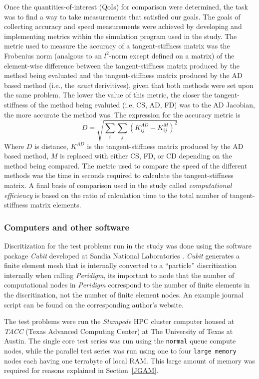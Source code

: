 \documentclass[preprint,12pt]{elsarticle}
\begin{document}
Once the quantities-of-interest (QoIs) for comparison were determined, the task was to find a way to take measurements that satisfied our goals. The goals of collecting accuracy and speed measurements were achieved by developing and implementing metrics within the simulation program used in the study. The metric used to measure the accuracy of a tangent-stiffness matrix was the Frobenius norm (analgous to an $l^2$-norm except defined on a matrix) of the element-wise difference between the tangent-stiffness matrix produced by the method being evaluated and the tangent-stiffness matrix produced by the AD based method (i.e., the \emph{exact} derivitives), given that both methods were set upon the same problem. The lower the value of this metric, the closer the tangent-stiffness of the method being evaluted (i.e, CS, AD, FD)  was to the AD Jacobian, the more accurate the method was. The expression for the accuracy metric is
%
\begin{equation} 
  D = \sqrt{\sum_i \sum_j(K^{AD}_{ij} - K^{M}_{ij})^2}
\end{equation}
%
Where $D$ is distance, $K^{AD}$ is the tangent-stiffness matrix produced by the AD based method, $M$ is replaced with either CS, FD, or CD depending on the method being compared.  The metric used to compare the speed of the different methods was the time in seconds required to calculate the tangent-stiffness matrix. A final basis of comparison used in the study called \emph{computational efficiency} is based on the ratio of calculation time to the total number of tangent-stiffness matrix elements.

\subsubsection{Computers and other software} 
%
Discritization for the test problems run in the study was done using the software package \emph{Cubit} developed at Sandia National Laboratories \cite{ref-Cubit}. \emph{Cubit} generates a finite element mesh that is internally converted to a ``particle'' discritization internally when calling \emph{Peridigm}, its important to node that the number of computational nodes in \emph{Peridigm} correspond to the number of finite elements in the discritization, not the number of finite element nodes.  An example journal script can be found on the corresponding author's website. 

The test problems were run the \emph{Stampede} HPC cluster computer housed at \emph{TACC} (Texas Advanced Computing Center) at The University of Texas at Austin. The single core test series was run using the {\tt normal} queue compute nodes, while the parallel test series was run using one to four {\tt large memory} nodes each having one terrabyte of local RAM. This large amount of memory was required for reasons explained in Section~\ref{JGAM}.  
\end{document}
